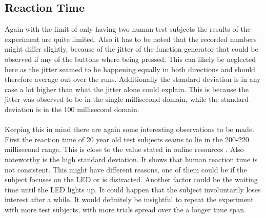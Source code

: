 \documentclass[fleqn,14pt]{article}
\begin{document}
\subsection{Reaction Time}
Again with the limit of only having two human test subjects the results of the experiment are quite limited.
Also it has to be noted that the recorded numbers might differ slightly, because of the jitter of the function
generator that could be observed if any of the buttons where being pressed. This can likely be neglected
here as the jitter seamed to be happening equally in both directions and should therefore average out
over the runs. Additionally the standard deviation is in any case a lot higher than what the jitter alone
could explain. This is because the jitter was observed to be in the single millisecond domain, while the
standard deviation is in the 100 millisecond domain.\\
\\
Keeping this in mind there are again some interesting observations to be made. First the reaction time of 20
year old test subjects seams to lie in the 200-220 millisecond range. This is close to the value stated in
online resources \cite{wiki} . Also noteworthy is the high standard deviation. It shows that human reaction time is not
consistent. This might have different reasons, one of them could be if the subject focuses on the LED
or is distracted. Another factor could be the waiting time until the LED lights up. It could happen that the
subject involuntarily loses interest after a while. It would definitely be insightful to repeat the experiment
with more test subjects, with more trials spread over the a longer time span.
\end{document}

